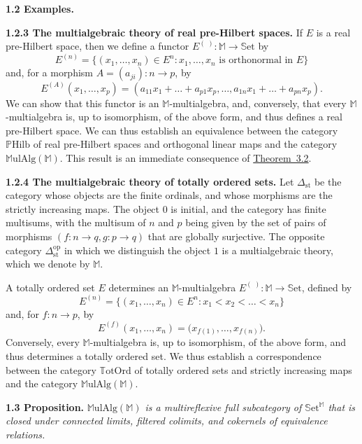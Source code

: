 \documentclass{article}
\newenvironment{itenv}[1]
  {\phantomsection\par\medskip\noindent\textbf{#1.}\itshape}
  {\medskip}
\newenvironment{rmenv}[1]
  {\phantomsection\par\medskip\noindent\textbf{#1.}\rmfamily}
  {\medskip}
\newcommand{\bb}[1]{{\mathbb{#1}}}
\newcommand{\op}{{\mathrm{op}}}
\newcommand{\st}{{\mathrm{st}}}
\newcommand{\Set}{\mathbb{S}\mathrm{et}}
\newcommand{\MulAlg}{\mathbb{M}\mathrm{ulAlg}}
\newcommand{\PHilb}{\mathbb{P}\mathrm{Hilb}}
\newcommand{\TotOrd}{\mathbb{T}\mathrm{otOrd}}
\newcommand{\oldpage}[1]{\marginpar{\footnotesize$\Big\vert$ \textit{p.~#1}}}
\begin{document}
\begin{rmenv}{1.2 Examples}
\begin{rmenv}{1.2.3 The multialgebraic theory of real pre-Hilbert spaces}
    If $E$ is a real pre-Hilbert space, then we define a functor $E^{(\,\,)}\colon\bb{M}\to\Set$ by
    \[
      E^{(n)} =
      \big\{
        (x_1,\ldots,x_n)\in E^n
        :
        \mbox{$x_1,\ldots,x_n$ is orthonormal in $E$}
      \big\}
    \]
    and, for a morphism $A=(a_{ji})\colon n\to p$, by
    \[
      E^{(A)}(x_1,\ldots,x_p) =
      (a_{11}x_1+\ldots+a_{p1}x_p,\ldots,a_{1n}x_1+\ldots+a_{pn}x_p).
    \]
    We can show that this functor is an $\bb{M}$-multialgebra, and, conversely, that every $\bb{M}$-multialgebra is, up to isomorphism, of the above form, and thus defines a real pre-Hilbert space.
    We can thus establish an equivalence between the category $\PHilb$ of real pre-Hilbert spaces and orthogonal linear maps and the category $\MulAlg(\bb{M})$.
    This result is an immediate consequence of \hyperref[3.2]{Theorem~3.2}.
  \end{rmenv}

  \begin{rmenv}{1.2.4 The multialgebraic theory of totally ordered sets}
  \label{1.2.4}
    Let $\Delta_\st$ be the category whose objects are the finite ordinals, and whose morphisms are the
\oldpage{197}
    strictly increasing maps.
    The object $0$ is initial, and the category has finite multisums, with the multisum of $n$ and $p$ being given by the set of pairs of morphisms $(f\colon n\to q,g\colon p\to q)$ that are globally surjective.
    The opposite category $\Delta_\st^\op$ in which we distinguish the object $1$ is a multialgebraic theory, which we denote by $\bb{M}$.

    A totally ordered set $E$ determines an $\bb{M}$-multialgebra $E^{(\,\,)}\colon\bb{M}\to\Set$, defined by
    \[
      E^{(n)} =
      \big\{
        (x_1,\ldots,x_n)\in E^n
        :
        x_1<x_2<\ldots<x_n
      \big\}
    \]
    and, for $f\colon n\to p$, by
    \[
      E^{(f)}(x_1,\ldots,x_n) =
      \big(
        x_{f(1)},\ldots,x_{f(n)}
      \big).
    \]
    Conversely, every $\bb{M}$-multialgebra is, up to isomorphism, of the above form, and thus determines a totally ordered set.
    We thus establish a correspondence between the category $\TotOrd$ of totally ordered sets and strictly increasing maps and the category $\MulAlg(\bb{M})$.
  \end{rmenv}

\end{rmenv}

\begin{itenv}{1.3 Proposition}
\label{1.3}
  $\MulAlg(\bb{M})$ is a multireflexive full subcategory of $\Set^\bb{M}$ that is closed under connected limits, filtered colimits, and cokernels of equivalence relations.
\end{itenv}
\end{document}
